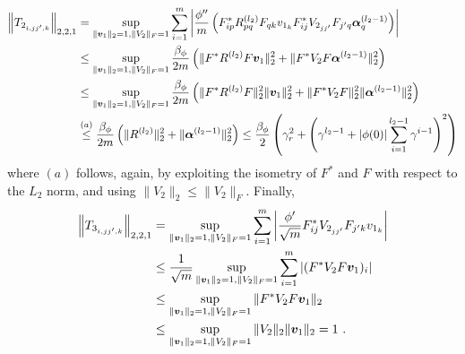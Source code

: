     \begin{align}
    \label{eq:T2_norm_d2_alpha_d_alpha_d_r}
        \begin{aligned}
            \left\|T_{2_{i,jj',k}} \right\|_{2,2,1} 
            &= \sup_{\|{\bm{v}}_1\|_2 = 1, \|V_2\|_F =1} \sum_{i=1}^m \left| 
                \frac{\phi''}{m} \left(
                    F^*_{ip}R^{(l_2)}_{pq}F_{qk}v_{1_k} F^{*}_{ij}V_{2_{jj'}}F_{j'q}\boldsymbol{\alpha}^{(l_2 - 1)}_q
                \right)
            \right|\\
            &\leq \sup_{\|{\bm{v}}_1\|_2 = 1, \|V_2\|_F =1} 
            \frac{\beta_{\phi}}{2m}\left( 
                \| F^*R^{(l_2)}F{\bm{v}}_1\|_2^2 + \| F^*V_2F\boldsymbol{\alpha}^{(l_2 - 1)}\|_2^2
            \right)\\
            &\leq \sup_{\|{\bm{v}}_1\|_2 = 1, \|V_2\|_F =1} 
            \frac{\beta_{\phi}}{2m} \left( 
                \| F^*R^{(l_2)}F\|_2^2 \|{\bm{v}}_1\|_2^2 +  \| F^*V_2F\|_2^2 \| \boldsymbol{\alpha}^{(l_2 - 1)}\|^2_{2}
            \right)\\
            &\overset{(a)}{\leq}
            \frac{\beta_{\phi}}{2m} \left( 
                \| R^{(l_2)}\|_2^2 +  \| \boldsymbol{\alpha}^{(l_2 - 1)}\|^2_{2}
            \right) \leq \frac{\beta_{\phi}}{2}\left( 
                \gamma_r^2 + \left( \gamma^{l_2 - 1} + |\phi(0)|\sum_{i=1}^{l_2 - 1} \gamma^{i-1}\right)^2
            \right)
        \end{aligned}
    \end{align}
    where $(a)$ follows, again, by exploiting the isometry of $F^*$ and $F$ with respect to the $L_2$ norm, and using $\|V_2\|_2 \leq \|V_2\|_F$. Finally,
    \begin{align}
    \label{eq:T3_norm_d2_alpha_d_alpha_d_r}
        \begin{aligned}
            \left\|T_{3_{i,jj',k}} \right\|_{2,2,1} 
            &= \sup_{\|{\bm{v}}_1\|_2 = 1, \|V_2\|_F =1} \sum_{i=1}^m \left| 
                \frac{\phi'}{\sqrt{m}} F^{*}_{ij}V_{2_{jj'}}F_{j'k}v_{1_k}
            \right|\\
            &\leq
            \frac{1}{\sqrt{m}} \sup_{\|{\bm{v}}_1\|_2 = 1, \|V_2\|_F =1}\sum^m_{i=1}\left|  
            (F^*V_2F{\bm{v}}_1)_i
            \right|\\
            &\leq \sup_{\|{\bm{v}}_1\|_2 = 1, \|V_2\|_F =1}
                \|F^*V_2F{\bm{v}}_1 \|_2\\ 
            &\leq \sup_{\|{\bm{v}}_1\|_2 = 1, \|V_2\|_F =1} 
            \|V_{2}\|_2\lVert{\bm{v}}_1\rVert_2 
            = 1~.
        \end{aligned}
    \end{align}

